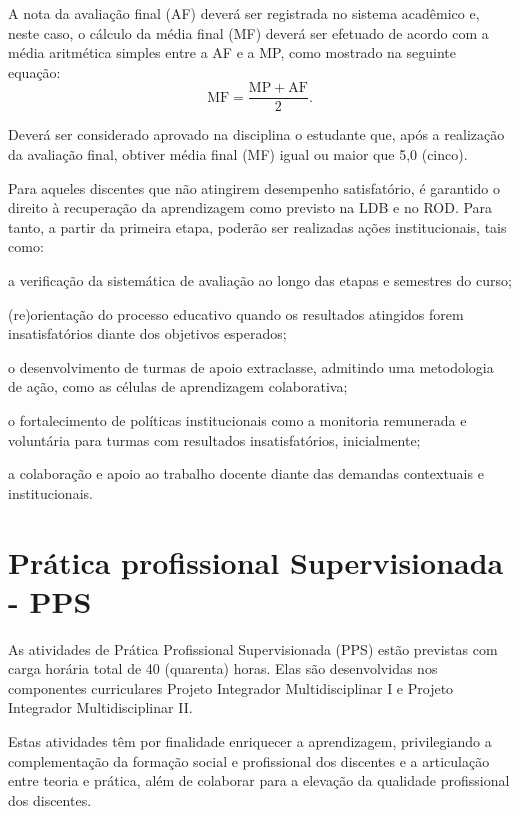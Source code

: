 \documentclass[
	12pt,				%
	openright,			%
	twoside,			%
	a4paper,			%
	chapter=TITLE,		%
	english,			%
	french,				%
	spanish,			%
	brazil,				%
	]{abntex2}
\begin{document}
A nota da avaliação final (AF) deverá ser registrada no sistema acadêmico e, neste caso, o cálculo da média final (MF) deverá ser efetuado de acordo com a média aritmética simples entre a AF e a MP, como mostrado na seguinte equação:
\[
    \mathrm{MF} = \frac{ \mathrm{MP} + \mathrm{AF}}{2}.
\]

Deverá ser considerado aprovado na disciplina o estudante que, após a realização da avaliação final, obtiver média final (MF) igual ou maior que 5,0 (cinco).

Para aqueles discentes que não atingirem desempenho satisfatório, é garantido o direito à recuperação da aprendizagem como previsto na LDB e no ROD. Para tanto, a partir da primeira etapa, poderão ser realizadas ações institucionais, tais como:
\begin{alineas}
	\item a verificação da sistemática de avaliação ao longo das etapas e semestres do curso;
 	\item (re)orientação do processo educativo quando os resultados atingidos forem insatisfatórios diante dos objetivos esperados;
 	\item o desenvolvimento de turmas de apoio extraclasse, admitindo uma metodologia de ação, como as células de aprendizagem colaborativa;
 	\item o fortalecimento de políticas institucionais como a monitoria remunerada e voluntária para turmas com resultados insatisfatórios, inicialmente;
 	\item a colaboração e apoio ao trabalho docente diante das demandas contextuais e institucionais.
\end{alineas}



\chapter{Prática profissional Supervisionada - PPS}
As atividades de Prática Profissional Supervisionada (PPS) estão previstas
com carga horária total de 40 (quarenta) horas. Elas são desenvolvidas nos
componentes curriculares Projeto Integrador Multidisciplinar I e Projeto Integrador
Multidisciplinar II.

Estas atividades têm por finalidade enriquecer a aprendizagem, privilegiando a
complementação da formação social e profissional dos discentes e a articulação
entre teoria e prática, além de colaborar para a elevação da qualidade
profissional dos discentes.
\end{document}

